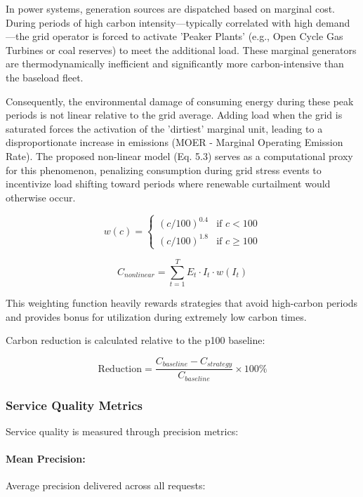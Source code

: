 In power systems, generation sources are dispatched based on marginal cost. During periods of high carbon intensity—typically correlated with high demand—the grid operator is forced to activate 'Peaker Plants' (e.g., Open Cycle Gas Turbines or coal reserves) to meet the additional load. These marginal generators are thermodynamically inefficient and significantly more carbon-intensive than the baseload fleet.

Consequently, the environmental damage of consuming energy during these peak periods is not linear relative to the grid average. Adding load when the grid is saturated forces the activation of the 'dirtiest' marginal unit, leading to a disproportionate increase in emissions (MOER - Marginal Operating Emission Rate). The proposed non-linear model (Eq. 5.3) serves as a computational proxy for this phenomenon, penalizing consumption during grid stress events to incentivize load shifting toward periods where renewable curtailment would otherwise occur.

\begin{equation}
w(c) = 
\begin{cases}
(c/100)^{0.4} & \text{if } c < 100 \\
(c/100)^{1.8} & \text{if } c \geq 100
\end{cases}
\end{equation}

\begin{equation}
    C_{nonlinear} = \sum_{t=1}^{T} E_t \cdot I_t \cdot w(I_t)
\end{equation}

This weighting function heavily rewards strategies that avoid high-carbon periods and provides bonus for utilization during extremely low carbon times.

Carbon reduction is calculated relative to the p100 baseline:

\begin{equation}
    \text{Reduction} = \frac{C_{baseline} - C_{strategy}}{C_{baseline}} \times 100\%
\end{equation}

\subsubsection{Service Quality Metrics}

Service quality is measured through precision metrics:

\paragraph{Mean Precision:} Average precision delivered across all requests:

